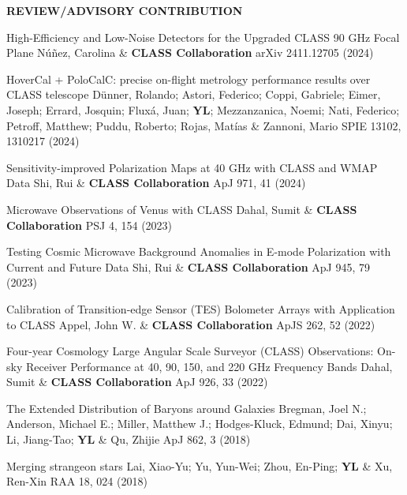 \begin{footnotesize}
    \textsf{\textbf{ REVIEW/ADVISORY CONTRIBUTION }}
\end{footnotesize}
\begin{etaremune}[topsep=0pt,itemsep=0pt,partopsep=0pt,parsep=0pt]
    \renewcommand\labelenumi{\footnotesize\bfseries\theenumi.}
    
            {High-Efficiency and Low-Noise Detectors for the Upgraded CLASS 90 GHz Focal Plane}
            {Núñez, Carolina \& \textbf{CLASS Collaboration}}
            {arXiv 2411.12705 (2024)}
    
            {HoverCal + PoloCalC: precise on-flight metrology performance results over CLASS telescope}
            {Dünner, Rolando; Astori, Federico; Coppi, Gabriele; Eimer, Joseph; Errard, Josquin; Fluxá, Juan; \textbf{YL}; Mezzanzanica, Noemi; Nati, Federico; Petroff, Matthew; Puddu, Roberto; Rojas, Matías \& Zannoni, Mario}
            {SPIE 13102, 1310217 (2024)}
    
            {Sensitivity-improved Polarization Maps at 40 GHz with CLASS and WMAP Data}
            {Shi, Rui \& \textbf{CLASS Collaboration}}
            {ApJ 971, 41 (2024)}
    
            {Microwave Observations of Venus with CLASS}
            {Dahal, Sumit \& \textbf{CLASS Collaboration}}
            {PSJ 4, 154 (2023)}
    
            {Testing Cosmic Microwave Background Anomalies in E-mode Polarization with Current and Future Data}
            {Shi, Rui \& \textbf{CLASS Collaboration}}
            {ApJ 945, 79 (2023)}
    
            {Calibration of Transition-edge Sensor (TES) Bolometer Arrays with Application to CLASS}
            {Appel, John W. \& \textbf{CLASS Collaboration}}
            {ApJS 262, 52 (2022)}
    
            {Four-year Cosmology Large Angular Scale Surveyor (CLASS) Observations: On-sky Receiver Performance at 40, 90, 150, and 220 GHz Frequency Bands}
            {Dahal, Sumit \& \textbf{CLASS Collaboration}}
            {ApJ 926, 33 (2022)}
    
            {The Extended Distribution of Baryons around Galaxies}
            {Bregman, Joel N.; Anderson, Michael E.; Miller, Matthew J.; Hodges-Kluck, Edmund; Dai, Xinyu; Li, Jiang-Tao; \textbf{YL} \& Qu, Zhijie}
            {ApJ 862, 3 (2018)}
    
            {Merging strangeon stars}
            {Lai, Xiao-Yu; Yu, Yun-Wei; Zhou, En-Ping; \textbf{YL} \& Xu, Ren-Xin}
            {RAA 18, 024 (2018)}
    
\end{etaremune}
